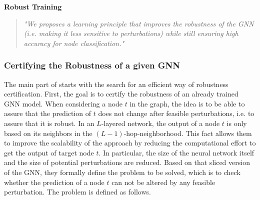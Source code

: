 \documentclass[a4paper,preprint]{sig-alternate}
\begin{document}
\textbf{Robust Training}
\begin{quote}
    \emph{"We proposes a learning principle that improves the robustness of the GNN (i.e. making it less sensitive to perturbations) 
    while still ensuring high accuracy for node classification."} \cite{Zuegner_2019}
\end{quote}

\subsubsection{Certifying the Robustness of a given GNN}
\label{subsec:robustness_certification}

The main part of \cite{Zuegner_2019} starts with the search for an efficient way of robustness certification.
First, the goal is to certify the robustness of an already trained GNN model. When considering a node $t$ in the graph, the idea is to be 
able to assure that the prediction of $t$ does not change after feasible perturbations, i.e. to assure that it is robust.
In an $L$-layered network, the output of a node $t$ is only based on its neighbors in the $(L-1)$-hop-neighborhood. \cite{Zuegner_2019}
This fact allows them to improve the scalability of the approach by reducing the computational effort to get the output
of target node $t$. In particular, the size of the neural network itself and the size of potential perturbations are reduced.
Based on that sliced version of the GNN, they formally define the problem to be solved, which is to check whether the prediction 
of a node $t$ can not be altered by any feasible perturbation. The problem is defined as follows.\newline
\end{document}
